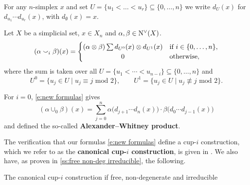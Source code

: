 \begin{notation}
	For any $n$-simplex $x$ and set $U = \{u_1 < \dots < u_r\} \subseteq \big\{ 0, \dots, n \big\}$ we write $d_U(x)$ for $d_{u_1}\! \dotsm d_{u_r}(x)$, with $d_{\emptyset}(x) = x$.
\end{notation}

\begin{definition} \label{d:my cup-i construction}
	Let $X$ be a simplicial set, $x \in X_n$ and $\alpha, \beta \in \operatorname{N^{\vee}}(X)$.
	\begin{equation} \label{e:new formulas}
	(\alpha \cup_i \beta)(x) =
	\begin{cases}
	(\alpha \ot \beta) \sum d_{U^0}(x) \ot d_{U^1}(x) &
	\text{if } i \in \{0, \dots, n\}, \\
	\hfil 0 &
	\text{otherwise},
	\end{cases}
	\end{equation}
	where the sum is taken over all $U = \{u_1 < \cdots < u_{n-i}\} \subseteq \{0, \dots, n\}$ and
	\begin{equation*}
	U^0 = \{u_j \in U \mid u_j \equiv j \text{ mod } 2\}, \qquad
	U^1 = \{u_j \in U \mid u_j \not\equiv j \text{ mod } 2\}.
	\end{equation*}
\end{definition}

\begin{example} \label{ex:alexander-whitney diagonal}
	For $i = 0$, \cref{e:new formulas} gives
	\begin{equation*}
	(\alpha \cup_0 \beta)(x) =
	\sum_{j=0}^n \alpha \big(d_{j+1} \cdots d_{n}(x)\big) \cdot \beta \big(d_{0} \cdots d_{j-1}(x)\big)
	\end{equation*}
	and defined the so-called \textbf{Alexander--Whitney product}.
\end{example}

The verification that our formulas \eqref{e:new formulas} define a \mbox{cup-$i$} construction, which we refer to as the \textbf{canonical cup-$i$ construction}, is given in \cite{medina2021fast_sq}.
We also have, as proven in \cref{ss:free non-deg irreducible}, the following.

\begin{theorem} \label{t:existence}
	The canonical cup-$i$ construction if free, non-degenerate and irreducible
\end{theorem}